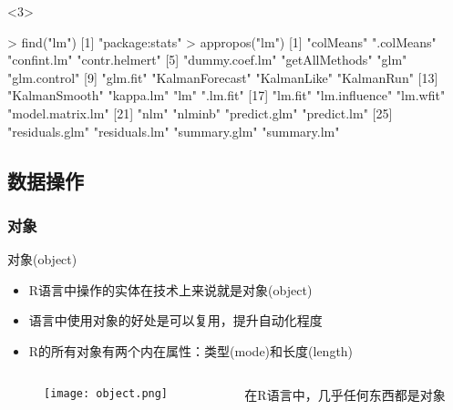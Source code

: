 \begin{frame}[t,fragile]{\subsecname}{\subsubsecname}
\begin{overlayarea}{\textwidth}{\textheight}
\begin{onlyenv}<3>
\begin{rcode}
> find("lm")
[1] "package:stats"
> appropos("lm")
 [1] "colMeans"        ".colMeans"       "confint.lm"      "contr.helmert"  
 [5] "dummy.coef.lm"   "getAllMethods"   "glm"             "glm.control"    
 [9] "glm.fit"         "KalmanForecast"  "KalmanLike"      "KalmanRun"      
[13] "KalmanSmooth"    "kappa.lm"        "lm"              ".lm.fit"        
[17] "lm.fit"          "lm.influence"    "lm.wfit"         "model.matrix.lm"
[21] "nlm"             "nlminb"          "predict.glm"     "predict.lm"     
[25] "residuals.glm"   "residuals.lm"    "summary.glm"     "summary.lm" 
\end{rcode}
\end{onlyenv}

\end{overlayarea}
\end{frame}

\subsection{数据操作}
\subsubsection{对象}
\begin{frame}[t]{\subsecname}{对象(object)}
  \begin{itemize}
  \item R语言中操作的实体在技术上来说就是对象(object) 
  \item 语言中使用对象的好处是可以复用，提升自动化程度
  \item R的所有对象有两个内在属性：类型(mode)和长度(length)
  \end{itemize}

  \begin{columns}
    \begin{column}{.5\textwidth}
      \begin{figure}
        \centering \texttt{[image: object.png]}
      \end{figure}
    \end{column}

    \begin{column}{.48\textwidth}
      \begin{ornamentblock}
        \centering
        {在R语言中，几乎任何东西都是对象}
      \end{ornamentblock}
    \end{column}
  \end{columns}
\end{frame}

